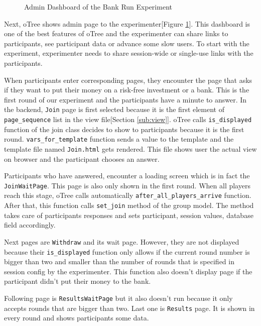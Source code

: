\begin{figure}[h]
	\centerline{}
	\caption{Admin Dashboard of the Bank Run Experiment }
	\label{fig:picture15}
\end{figure}

Next, oTree shows admin page to the experimenter[Figure \ref{fig:picture15}]. This dashboard is one of the best features of oTree and the experimenter can share links to participants, see participant data or advance some slow users. To start with the experiment, experimenter needs to share session-wide or single-use links with the participants. 

When participants enter corresponding pages, they encounter the page that asks if they want to put their money on a risk-free investment or a bank. This is the first round of our experiment and the participants have a minute to answer. In the backend, \verb|Join| page is first selected because it is the first element of \verb|page_sequence| list in the view file[Section \ref{sub:view}]. oTree calls \verb|is_displayed| function of the join class decides to show to participants because it is the first round. \verb|vars_for_template| function sends a value to the template and the template file named \verb|Join.html| gets rendered. This file shows user the actual view on browser and the participant chooses an answer. 

Participants who have answered, encounter a loading screen which is in fact the \verb|JoinWaitPage|. This page is also only shown in the first round. When all players reach this stage, oTree calls automatically \verb|after_all_players_arrive| function. After that, this function calls \verb|set_join| method of the group model. The method takes care of participants responses and sets participant, session values, database field accordingly.

Next pages are \verb|Withdraw| and its wait page. However, they are not displayed because their \verb|is_displayed| function only allows if the current round number is bigger than two and smaller than the number of rounds that is specified in session config by the experimenter. This function also doesn't display page if the participant didn't put their money to the bank. 

Following page is \verb|ResultsWaitPage| but it also doesn't run because it only accepts rounds that are bigger than two. Last one is \verb|Results| page. It is shown in every round and shows participants some data.

